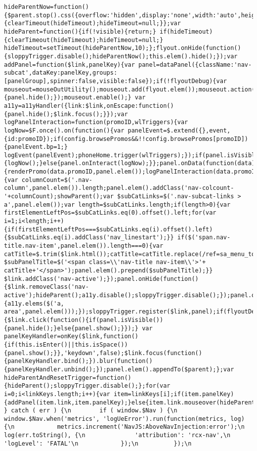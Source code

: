 \documentclass[
]{article}
\begin{document}
\begin{verbatim}
hideParentNow=function(){$parent.stop().css({overflow:'hidden',display:'none',width:'auto',height:'auto'});panels.hideAll({group:panelGroup});visible=false;if(hideTimeout){clearTimeout(hideTimeout);hideTimeout=null;}};var hideParent=function(){if(!visible){return;} if(hideTimeout){clearTimeout(hideTimeout);hideTimeout=null;} hideTimeout=setTimeout(hideParentNow,10);};flyout.onHide(function(){sloppyTrigger.disable();hideParentNow();this.elem().hide();});var addPanel=function($link,panelKey){var panel=dataPanel({className:'nav-subcat',dataKey:panelKey,groups:[panelGroup],spinner:false,visible:false});if(!flyoutDebug){var mouseout=mouseOutUtility();mouseout.add(flyout.elem());mouseout.action(function(){panel.hide();});mouseout.enable();} var a11y=a11yHandler({link:$link,onEscape:function(){panel.hide();$link.focus();}});var logPanelInteraction=function(promoID,wlTriggers){var logNow=$F.once().on(function(){var panelEvent=$.extend({},event,{id:promoID});if(config.browsePromos&&!!config.browsePromos[promoID]){panelEvent.bp=1;} logEvent(panelEvent);phoneHome.trigger(wlTriggers);});if(panel.isVisible()&&panel.hasInteracted()){logNow();}else{panel.onInteract(logNow);}};panel.onData(function(data){renderPromo(data.promoID,panel.elem());logPanelInteraction(data.promoID,data.wlTriggers);});panel.onShow(function(){var columnCount=$('.nav-column',panel.elem()).length;panel.elem().addClass('nav-colcount-'+columnCount);showParent();var $subCatLinks=$('.nav-subcat-links > a',panel.elem());var length=$subCatLinks.length;if(length>0){var firstElementLeftPos=$subCatLinks.eq(0).offset().left;for(var i=1;i<length;i++){if(firstElementLeftPos===$subCatLinks.eq(i).offset().left){$subCatLinks.eq(i).addClass('nav_linestart');}} if($('span.nav-title.nav-item',panel.elem()).length===0){var catTitle=$.trim($link.html());catTitle=catTitle.replace(/ref=sa_menu_top/g,'ref=sa_menu');var $subPanelTitle=$('<span class=\\'nav-title nav-item\\'>'+ catTitle+'</span>');panel.elem().prepend($subPanelTitle);}} $link.addClass('nav-active');});panel.onHide(function(){$link.removeClass('nav-active');hideParent();a11y.disable();sloppyTrigger.disable();});panel.onShow(function(){a11y.elems($('a, area',panel.elem()));});sloppyTrigger.register($link,panel);if(flyoutDebug){$link.click(function(){if(panel.isVisible()){panel.hide();}else{panel.show();}});} var panelKeyHandler=onKey($link,function(){if(this.isEnter()||this.isSpace()){panel.show();}},'keydown',false);$link.focus(function(){panelKeyHandler.bind();}).blur(function(){panelKeyHandler.unbind();});panel.elem().appendTo($parent);};var hideParentAndResetTrigger=function(){hideParent();sloppyTrigger.disable();};for(var i=0;i<linkKeys.length;i++){var item=linkKeys[i];if(item.panelKey){addPanel(item.link,item.panelKey);}else{item.link.mouseover(hideParentAndResetTrigger);}}};});};\n      } catch ( err ) {\n        if ( window.$Nav ) {\n          window.$Nav.when('metrics', 'logUeError').run(function(metrics, log) {\n            metrics.increment('NavJS:AboveNavInjection:error');\n            log(err.toString(), {\n              'attribution': 'rcx-nav',\n              'logLevel': 'FATAL'\n            });\n          });\n        
\end{verbatim}
\end{document}
